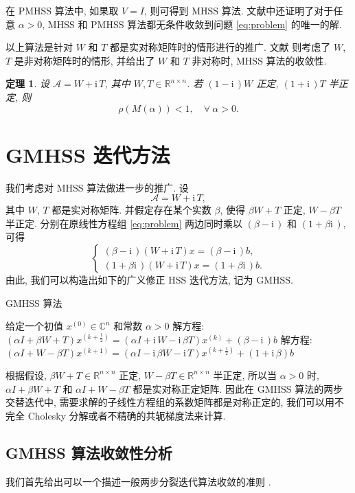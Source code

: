 \documentclass[UTF8]{ctexart}
\theoremstyle{plain}
\newtheorem{theorem}{定理}[section]
\theoremstyle{nonumberplain}
\numberwithin{equation}{section} %
\newcommand{\CC}{\ensuremath{\mathbb{C}}}
\newcommand{\RR}{\ensuremath{\mathbb{R}}}
\newcommand{\A}{\mathcal{A}}
\newcommand{\ii}{\bm{\mathrm{i}}\,} %
\begin{document}
在 PMHSS 算法中, 如果取 $V=I$, 则可得到 MHSS 算法.
文献中还证明了对于任意 $\alpha>0$,
MHSS 和 PMHSS 算法都无条件收敛到问题 \eqref{eq:problem} 的唯一的解.

以上算法是针对 $W$ 和 $T$ 都是实对称矩阵时的情形进行的推广.
文献 \cite{GW12} 则考虑了 $W$, $T$ 是非对称矩阵时的情形,
并给出了 $W$ 和 $T$ 非对称时, MHSS 算法的收敛性.
\begin{theorem}
  设 $\A = W + \ii T$, 其中 $W, T \in \RR^{n \times n}$.
  若 $(1-\ii)W$ 正定, $(1+\ii)T$ 半正定, 则
  $$
    \rho(M(\alpha))<1, \quad\forall \ \alpha>0.
  $$
\end{theorem}

\section{GMHSS 迭代方法}
我们考虑对 MHSS 算法做进一步的推广. 设
$$
  \A = W + \ii T,
$$
其中 $W$, $T$ 都是实对称矩阵.
并假定存在某个实数 $\beta$, 使得 $\beta W+T$ 正定, $W-\beta T$ 半正定.
分别在原线性方程组 \eqref{eq:problem} 两边同时乘以
$(\beta-\ii)$ 和 $(1+\beta\ii)$, 可得
$$
  \begin{cases}
    (\beta-\ii)(W+\ii T)x = (\beta-\ii)b, \\
    (1+\beta\ii)(W+\ii T)x = (1+\beta\ii)b.
  \end{cases}
$$
由此, 我们可以构造出如下的广义修正 HSS 迭代方法, 记为 GMHSS.

\begin{algorithm}[H]
\caption{GMHSS 算法\label{Alg:GMHSS}}
\begin{algorithmic}[1]
  \State 给定一个初值 $ x^{(0)} \in \CC^{n} $ 和常数 $\alpha>0$
  \State 解方程:
    $(\alpha I + \beta W + T) x^{(k+\frac{1}{2})}
     =(\alpha I + \ii W - \ii\beta T) x^{(k)} + (\beta-\ii)b$
  \State 解方程:
    $(\alpha I + W - \beta T) x^{(k+1)}
      =(\alpha I - \ii\beta W - \ii T) x^{(k+\frac{1}{2})} + (1+\ii\beta)b$
  \EndFor
\end{algorithmic}
\end{algorithm}

根据假设, $\beta W + T \in \RR^{n\times n}$ 正定, $W - \beta T \in \RR^{n\times n}$ 半正定,
所以当 $\alpha>0$ 时, $\alpha I + \beta W + T$ 和 $\alpha I + W - \beta T$ 都是实对称正定矩阵.
因此在 GMHSS 算法的两步交替迭代中, 需要求解的子线性方程组的系数矩阵都是对称正定的,
我们可以用不完全 Cholesky 分解或者不精确的共轭梯度法来计算.

\subsection{GMHSS 算法收敛性分析}
我们首先给出可以一个描述一般两步分裂迭代算法收敛的准则 \cite{BGN03}.
\end{document}
